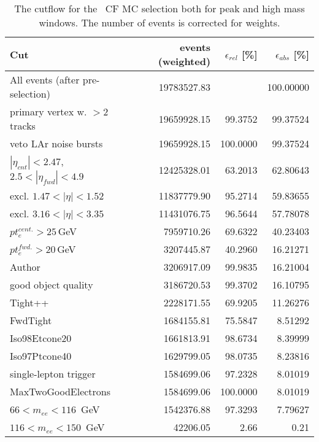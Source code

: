 \begin{table}
\centering
\begin{tabular}{@{}lrrr@{}} \hline \hline
 Cut & events (weighted)  & $\epsilon_{rel}$ [\%] & $\epsilon_{abs}$ [\%] \\\hline
 All events (after pre-selection) &     19783527.83 &             &   100.00000 \\
 primary vertex w. $>2$ tracks &     19659928.15 &     99.3752 &    99.37524 \\
 veto LAr noise bursts &     19659928.15 &    100.0000 &    99.37524 \\
$|\eta_{cnt}| < 2.47$, $2.5<|\eta_{fwd}|<4.9$ &     12425328.01 &     63.2013 &    62.80643 \\
excl. $1.47 < |\eta| < 1.52$ &     11837779.90 &     95.2714 &    59.83655 \\
excl. $3.16 < |\eta| < 3.35$ &     11431076.75 &     96.5644 &    57.78078 \\
$pt_{e}^{cent.} > 25$\,GeV &      7959710.26 &     69.6322 &    40.23403 \\
$pt_{e}^{fwd.} > 20$\,GeV &      3207445.87 &     40.2960 &    16.21271 \\
Author &      3206917.09 &     99.9835 &    16.21004 \\
good object quality &      3186720.53 &     99.3702 &    16.10795 \\
 Tight++ &      2228171.55 &     69.9205 &    11.26276 \\
 FwdTight &      1684155.81 &     75.5847 &     8.51292 \\
 Iso98Etcone20 &      1661813.91 &     98.6734 &     8.39999 \\
 Iso97Ptcone40 &      1629799.05 &     98.0735 &     8.23816 \\
 single-lepton trigger &      1584699.06 &     97.2328 &     8.01019 \\
 MaxTwoGoodElectrons &      1584699.06 &    100.0000 &     8.01019 \\ \hline
 $66 < m_{ee} < 116$~GeV &      1542376.88 &     97.3293 &     7.79627 \\
 $116 < m_{ee} < 150$~GeV &        42206.05 &        2.66 &     0.21 \\ \hline \hline
\end{tabular}
\caption{The cutflow for the \Zee\ CF MC selection both for peak and high mass windows. The number of events is corrected for weights.}
\label{tab:sel_cutflow_MC}
\end{table}
